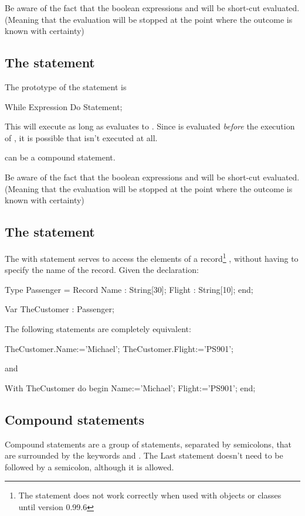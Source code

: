 \documentclass{report}
\begin{document}
Be aware of the fact that the boolean expressions  and
 will be short-cut evaluated. (Meaning that the evaluation
will be stopped at the point where the outcome is known with certainty)

\subsection{The  statement}
The prototype of the  statement is
\begin{listing}
While Expression Do
  Statement;
\end{listing}
This will execute  as long as  evaluates to
. Since  is evaluated {\em before} the execution
of , it is possible that  isn't executed at
all.

 can be a compound statement.

Be aware of the fact that the boolean expressions  and
 will be short-cut evaluated. (Meaning that the evaluation
will be stopped at the point where the outcome is known with certainty)

\subsection{The  statement}

The with statement serves to access the elements of a record\footnote{
The  statement does not work correctly when used with 
objects or classes until version 0.99.6}
, without
having to specify the name of the record. Given the declaration:
\begin{listing}
Type Passenger = Record
       Name : String[30];
       Flight : String[10];
       end;

Var TheCustomer : Passenger;
\end{listing}
The following statements are completely equivalent:
\begin{listing}
TheCustomer.Name:='Michael';
TheCustomer.Flight:='PS901';
\end{listing}
and
\begin{listing}
With TheCustomer do
  begin
  Name:='Michael';
  Flight:='PS901';
  end;
\end{listing}

\subsection{Compound statements}
Compound statements are a group of statements, separated by semicolons,
that are surrounded by the keywords  and . The
Last statement doesn't need to be followed by a semicolon, although it is
allowed.
\end{document}
